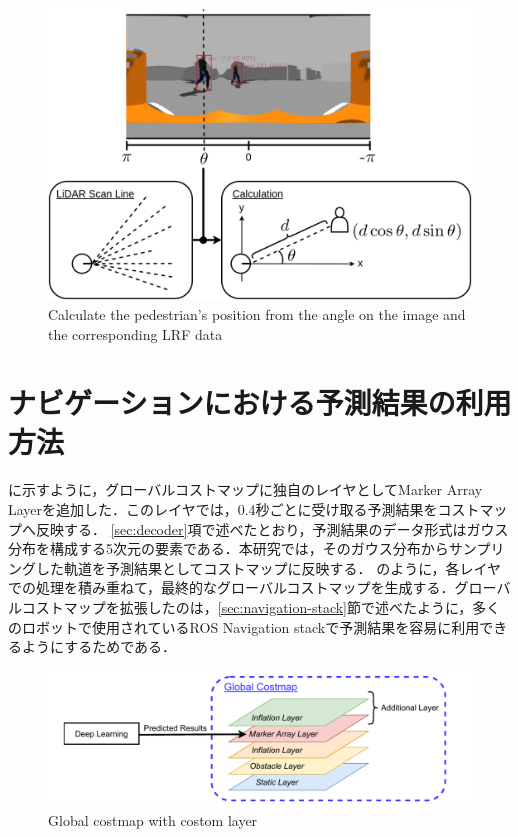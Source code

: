 \newpage

\begin{figure}[H]
  \centering
 \includegraphics[keepaspectratio, scale=0.35]
      {images/yolo-calc.png}
\caption{Calculate the pedestrian's position from the angle on the image and the corresponding LRF data}
 \label{Fig:yolo-calc}
\end{figure} 

\newpage

\vspace*{-25pt}
\section{ナビゲーションにおける予測結果の利用方法}\label{sec:nav-usage}
に示すように，グローバルコストマップに独自のレイヤとしてMarker Array Layerを追加した．このレイヤでは，0.4秒ごとに受け取る予測結果をコストマップへ反映する．
\ref{sec:decoder}項で述べたとおり，予測結果のデータ形式はガウス分布を構成する5次元の要素である．本研究では，そのガウス分布からサンプリングした軌道を予測結果としてコストマップに反映する．
のように，各レイヤでの処理を積み重ねて，最終的なグローバルコストマップを生成する．グローバルコストマップを拡張したのは，\ref{sec:navigation-stack}節で述べたように，多くのロボットで使用されているROS Navigation stackで予測結果を容易に利用できるようにするためである．
\vspace{-12pt}
\begin{figure}[H]
  \centering
 \includegraphics[keepaspectratio, scale=0.65]
      {images/layer.pdf}
\caption{Global costmap with costom layer}
 \label{Fig:global-costmap}
\end{figure} 

